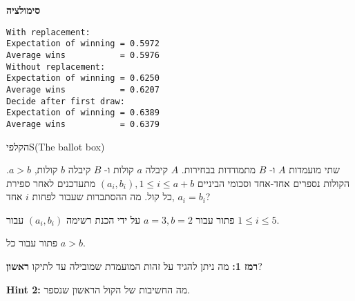 \textbf{סימולציה}
\begin{verbatim}
With replacement:
Expectation of winning = 0.5972
Average wins           = 0.5976
Without replacement:
Expectation of winning = 0.6250
Average wins           = 0.6207
Decide after first draw:
Expectation of winning = 0.6389
Average wins           = 0.6379
\end{verbatim}



\begin{prob}{הקלפי}{S}{(The ballot box)}

שתי מועמדות 
$A$
ו-%
$B$
מתמודדות בבחירות. 
$A$
קיבלה
$a$
קולות ו-%
$B$
קיבלה
$b$
קולות,
$a>b$.
הקולות נספרים אחד-אחד וסכומי הביניים
$(a_i,b_i), 1\leq i \leq a+b$
מתעדכנים לאחר ספירת כל קול. מה ההסתברות שעבור לפחות
$i$
אחד,
$a_i=b_i$?

פתור עבור
$a=3, b=2$
על ידי הכנת רשימה
$(a_i,b_i)$
עבור
$1\leq i\leq 5$.

פתור עבור כל
$a>b$.

\textbf{רמז 1:} 
מה ניתן להגיד על זהות המועמדת שמובילה עד לתיקו 
\textbf{ראשון}?

\textbf{Hint 2:}
מה החשיבות של הקול הראשון שנספר.
\end{prob}
\solution{}

